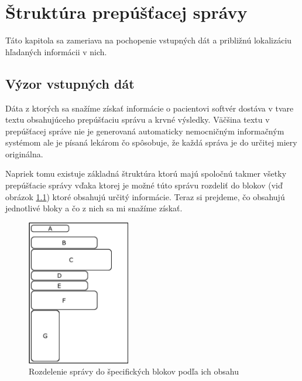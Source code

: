 \chapter{Štruktúra prepúšťacej správy}

\label{kap:strukSpravy} %

Táto kapitola sa zameriava na pochopenie vstupných dát a približnú lokalizáciu hľadaných informácii v nich.

\section{Výzor vstupných dát}

Dáta z ktorých sa snažíme získať informácie o pacientovi softvér dostáva v tvare textu obsahujúceho prepúšťaciu správu a krvné výsledky. Väčšina textu v prepúšťacej správe nie je generovaná automaticky nemocničným informačným systémom ale je písaná lekárom čo spôsobuje, že každá správa je do určitej miery originálna.

Napriek tomu existuje základná štruktúra ktorú majú spoločnú takmer všetky prepúšťacie správy vďaka ktorej je možné túto správu rozdeliť do blokov (viď obrázok \ref{obr:sprava}) ktoré obsahujú určitý informácie. Teraz si prejdeme, čo obsahujú jednotlivé bloky a čo z nich sa mi snažíme získať.

\begin{figure}
	\centerline{\includegraphics[width=0.4\textwidth]{images/vyzor_spravy}}
	\caption[Rozloženie správy]{Rozdelenie správy do špecifických blokov podľa ich obsahu}
	\label{obr:sprava}
\end{figure}

